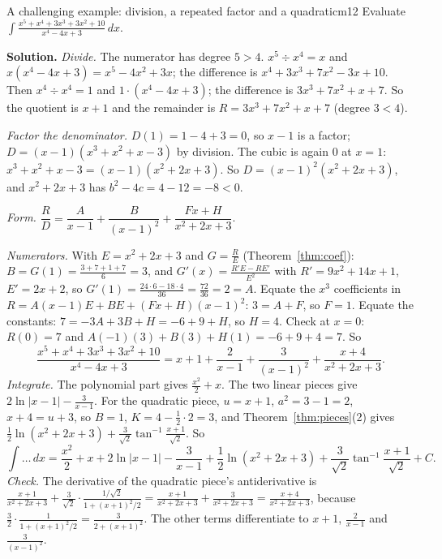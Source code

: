 \documentclass[11pt]{article}
\begin{document}
\begin{exmp}{A challenging example: division, a repeated factor and a quadratic}{m12}
Evaluate $\displaystyle\int\frac{x^5+x^4+3x^3+3x^2+10}{x^4-4x+3}\,dx$.

\textbf{Solution.} \emph{Divide.} The numerator has degree $5>4$. $x^5\div x^4=x$ and $x(x^4-4x+3)=x^5-4x^2+3x$; the difference is $x^4+3x^3+7x^2-3x+10$. Then $x^4\div x^4=1$ and $1\cdot(x^4-4x+3)$; the difference is $3x^3+7x^2+x+7$. So the quotient is $x+1$ and the remainder is $R=3x^3+7x^2+x+7$ (degree $3<4$).

\emph{Factor the denominator.} $D(1)=1-4+3=0$, so $x-1$ is a factor; $D=(x-1)(x^3+x^2+x-3)$ by division. The cubic is again $0$ at $x=1$: $x^3+x^2+x-3=(x-1)(x^2+2x+3)$. So $D=(x-1)^2(x^2+2x+3)$, and $x^2+2x+3$ has $b^2-4c=4-12=-8<0$.

\emph{Form.} $\dfrac R D=\dfrac A{x-1}+\dfrac B{(x-1)^2}+\dfrac{Fx+H}{x^2+2x+3}$.

\emph{Numerators.} With $E=x^2+2x+3$ and $G=\frac RE$ (Theorem~\ref{thm:coef}): $B=G(1)=\frac{3+7+1+7}{6}=3$, and $G'(x)=\frac{R'E-RE'}{E^2}$ with $R'=9x^2+14x+1$, $E'=2x+2$, so $G'(1)=\frac{24\cdot6-18\cdot4}{36}=\frac{72}{36}=2=A$. Equate the $x^3$ coefficients in $R=A(x-1)E+BE+(Fx+H)(x-1)^2$: $3=A+F$, so $F=1$. Equate the constants: $7=-3A+3B+H=-6+9+H$, so $H=4$. Check at $x=0$: $R(0)=7$ and $A(-1)(3)+B(3)+H(1)=-6+9+4=7$. So
\[\frac{x^5+x^4+3x^3+3x^2+10}{x^4-4x+3}=x+1+\frac2{x-1}+\frac3{(x-1)^2}+\frac{x+4}{x^2+2x+3}.\]
\emph{Integrate.} The polynomial part gives $\frac{x^2}2+x$. The two linear pieces give $2\ln\lvert x-1\rvert-\frac3{x-1}$. For the quadratic piece, $u=x+1$, $a^2=3-1=2$, $x+4=u+3$, so $B=1$, $K=4-\frac12\cdot2=3$, and Theorem~\ref{thm:pieces}(2) gives $\frac12\ln(x^2+2x+3)+\frac3{\sqrt2}\tan^{-1}\frac{x+1}{\sqrt2}$. So
\[\int\ldots\,dx=\frac{x^2}2+x+2\ln\lvert x-1\rvert-\frac3{x-1}+\frac12\ln\left(x^2+2x+3\right)+\frac3{\sqrt2}\tan^{-1}\frac{x+1}{\sqrt2}+C .\]
\emph{Check.} The derivative of the quadratic piece's antiderivative is $\frac{x+1}{x^2+2x+3}+\frac3{\sqrt2}\cdot\frac{1/\sqrt2}{1+(x+1)^2/2}=\frac{x+1}{x^2+2x+3}+\frac{3}{x^2+2x+3}=\frac{x+4}{x^2+2x+3}$, because $\frac32\cdot\frac{1}{1+(x+1)^2/2}=\frac{3}{2+(x+1)^2}$. The other terms differentiate to $x+1$, $\frac2{x-1}$ and $\frac3{(x-1)^2}$.
\end{exmp}
\end{document}

